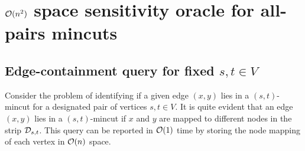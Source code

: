 \chapter{${\cal O}(n^2)$ space sensitivity oracle for all-pairs mincuts}






\section{Edge-containment query for fixed $s,t \in V$} \label{subsec:fixed-s-t}


Consider the problem of identifying if a given edge $(x,y)$ lies in a $(s,t)$-mincut for a designated pair of vertices $s,t \in V$. It is quite evident that an edge $(x,y)$ lies in a $(s,t)$-mincut if $x$ and $y$ are mapped to different nodes in the strip ${\cal D}_{s,t}$. This query can be reported in ${\cal O}(1)$ time by storing the node mapping of each vertex in ${\cal O}(n)$ space.

